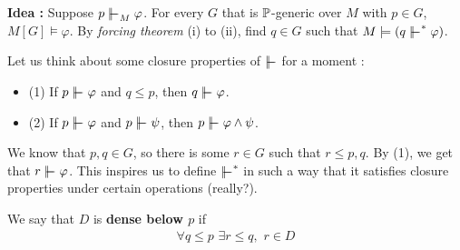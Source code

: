 \documentclass[12pt,a4paper]{article}
\renewenvironment{i}
{\begin{itemize} 
	}%
	{\end{itemize}
}
\begin{document}
\textbf{Idea :} Suppose $p\forces_M \varphi$. For every $G$ that is $\mathbb{P}$-generic over $M$ with $p\in G$, $M[G] \models \varphi$. By \emph{forcing theorem} (i) to (ii), find $q\in G$ such that  $M\models (q\forces^* \varphi)$.

\quad Let us think about some closure properties of $\forces$ for a moment :
\begin{i}
\item[(1)] If $p\forces \varphi$ and $q\leq p$, then $q\forces \varphi$.
\item[(2)] If $p\forces \varphi$ and $p\forces \psi$, then $p\forces \varphi \wedge \psi$. 
\end{i}
We know that $p, q\in G$, so there is some $r\in G$ such that $r\leq p, q$. By (1), we get that $r\forces \varphi$. This inspires us to define $\forces^*$ in such a way that it satisfies closure properties under certain operations (really?).
\s

 We say that $D$ is \textbf{dense below $p$} if
\begin{align*}
\forall q\leq p \,\, \exists r\leq q, \,\, r\in D
\end{align*}
\s
\end{document}
